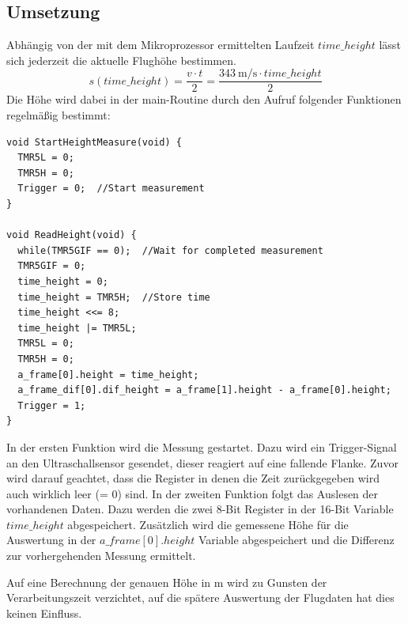   \subsection{Umsetzung}
  Abhängig von der mit dem Mikroprozessor ermittelten Laufzeit $time\_height$ lässt sich jederzeit die aktuelle Flughöhe bestimmen.
  \[
  s(time\_height) = \frac{v \cdot t}{2} = \frac{\SI{343}{\meter\per\second} \cdot time\_height}{2}
  \]
  Die Höhe wird dabei in der main-Routine durch den Aufruf folgender Funktionen regelmäßig bestimmt:
  \lstset{language = c}
  \begin{lstlisting}
void StartHeightMeasure(void) {
  TMR5L = 0;
  TMR5H = 0;
  Trigger = 0;  //Start measurement
}

void ReadHeight(void) {
  while(TMR5GIF == 0);  //Wait for completed measurement
  TMR5GIF = 0;
  time_height = 0;
  time_height = TMR5H;  //Store time
  time_height <<= 8;
  time_height |= TMR5L;
  TMR5L = 0;
  TMR5H = 0;
  a_frame[0].height = time_height;
  a_frame_dif[0].dif_height = a_frame[1].height - a_frame[0].height;
  Trigger = 1;
}
  \end{lstlisting}

  In der ersten Funktion wird die Messung gestartet. Dazu wird ein Trigger-Signal an den Ultraschallsensor gesendet, dieser reagiert auf eine fallende Flanke.
  Zuvor wird darauf geachtet, dass die Register in denen die Zeit zurückgegeben wird auch wirklich leer (= 0) sind.
  In der zweiten Funktion folgt das Auslesen der vorhandenen Daten. Dazu werden die zwei 8-Bit Register in der 16-Bit Variable $time\_height$ abgespeichert.
  Zusätzlich wird die gemessene Höhe für die Auswertung in der $a\_frame[0].height$ Variable abgespeichert und die Differenz zur vorhergehenden Messung ermittelt.

  Auf eine Berechnung der genauen Höhe in m wird zu Gunsten der Verarbeitungszeit verzichtet, auf die spätere Auswertung der Flugdaten hat dies keinen Einfluss.

